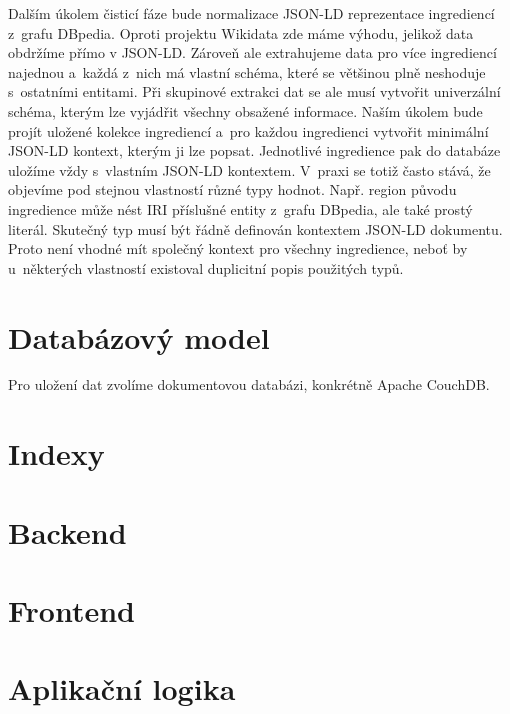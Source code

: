 Dalším úkolem čisticí fáze bude normalizace JSON-LD reprezentace ingrediencí z~grafu DBpedia. Oproti projektu Wikidata zde máme výhodu, jelikož data obdržíme přímo v JSON-LD. Zároveň ale extrahujeme data pro více ingrediencí najednou a~každá z~nich má vlastní schéma, které se většinou plně neshoduje s~ostatními entitami. Při skupinové extrakci dat se ale musí vytvořit univerzální schéma, kterým lze vyjádřit všechny obsažené informace. Naším úkolem bude projít uložené kolekce ingrediencí a~pro každou ingredienci vytvořit minimální JSON-LD kontext, kterým ji lze popsat. Jednotlivé ingredience pak do databáze uložíme vždy s~vlastním JSON-LD kontextem. V~praxi se totiž často stává, že objevíme pod stejnou vlastností různé typy hodnot. Např. region původu ingredience může nést IRI příslušné entity z~grafu DBpedia, ale také prostý literál. Skutečný typ musí být řádně definován kontextem JSON-LD dokumentu. Proto není vhodné mít společný kontext pro všechny ingredience, neboť by u~některých vlastností existoval duplicitní popis použitých typů.

\section{Databázový model}

Pro uložení dat zvolíme dokumentovou databázi, konkrétně Apache CouchDB. 


\section{Indexy}



\section{Backend}


\section{Frontend}


\section{Aplikační logika}